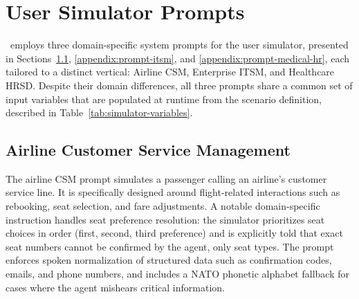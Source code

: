 \clearpage
\section{User Simulator Prompts}
\label{app:simulator-prompts}

\framework~employs three domain-specific system prompts for the user simulator, presented in Sections~\ref{appendix:prompt-airline}, \ref{appendix:prompt-itsm}, and \ref{appendix:prompt-medical-hr}, each tailored to a distinct vertical: Airline CSM, Enterprise ITSM, and Healthcare HRSD. Despite their domain differences, all three prompts share a common set of input variables that are populated at runtime from the scenario definition, described in Table~\ref{tab:simulator-variables}.



\subsection{Airline Customer Service Management}
\label{appendix:prompt-airline}

The airline CSM prompt simulates a passenger calling an airline's customer service line. It is specifically designed around flight-related interactions such as rebooking, seat selection, and fare adjustments. A notable domain-specific instruction handles seat preference resolution: the simulator prioritizes seat choices in order (first, second, third preference) and is explicitly told that exact seat numbers cannot be confirmed by the agent, only seat types. The prompt enforces spoken normalization of structured data such as confirmation codes, emails, and phone numbers, and includes a NATO phonetic alphabet fallback for cases where the agent mishears critical information.

